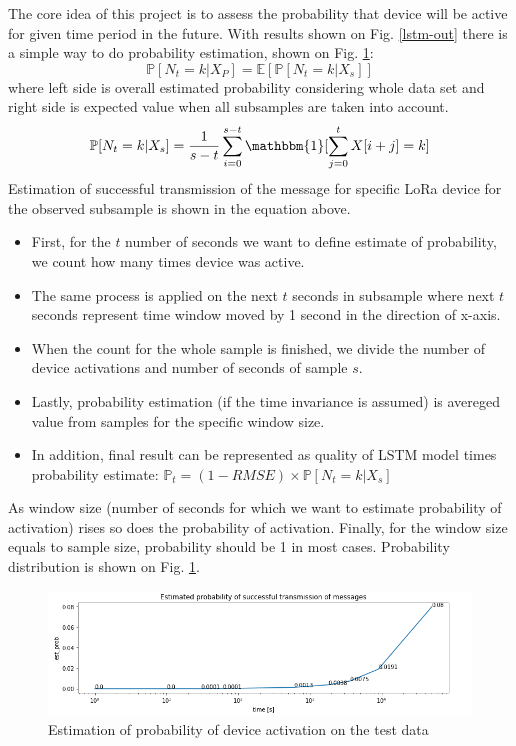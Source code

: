 \documentclass[11pt, a4paper]{article} %
\begin{document}
The core idea of this project is to assess the probability that device will be active for given time period in the future. 
With results shown on Fig. \ref{lstm-out} there is a simple way to do probability estimation, shown on Fig. \ref{est-prob}:
$$ \mathbb{P}[N_{t} = k | X_{P}] = \mathbb{E}[\mathbb{P}[N_{t} = k | X_{s}]] $$
where left side is overall estimated probability considering whole data set and right side is expected value when all subsamples are taken into account.
$$ \mathbb{P}[N_{t} = k | X_{s}] =  \frac{1}{s-t}  \sum_{i=0}^{s-t}\mathbbm{1}[\sum_{j=0}^{t}X[i+j]=k] $$
Estimation of successful transmission of the message for specific LoRa device for the observed subsample is shown in the equation above.
\begin{itemize}
	\item First, for the $ t $ number of seconds we want to define estimate of probability, we count how many times device was active.
	\item The same process is applied on the next $ t $ seconds in subsample where next $ t $ seconds represent time window moved by 1 second in the direction of x-axis.
	\item When the count for the whole sample is finished, we divide the number of device activations and number of seconds of sample $ s $. 
	\item Lastly, probability estimation (if the time invariance is assumed) is avereged value from samples for the specific window size.
	\item In addition, final result can be represented as quality of LSTM model times probability estimate: $ \mathbb{P}_{t} = (1-RMSE) \times \mathbb{P}[N_{t} = k | X_{s}] $ 
\end{itemize} 
As window size (number of seconds for which we want to estimate probability of activation) rises so does the probability of activation. Finally, for the window size equals to sample size, probability should be 1 in most cases. 
Probability distribution is shown on Fig. \ref{est-prob}.
\begin{figure}
	\centering
	\includegraphics[scale=.6]{images/est-prob.png} %
	\caption{Estimation of probability of device activation on the test data}
	\label{est-prob} 
\end{figure}
\end{document}
